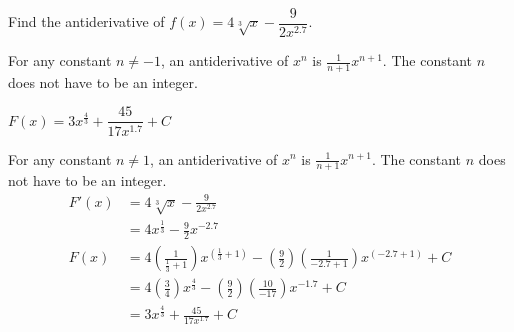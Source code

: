 \begin{Mquestion}
Find the antiderivative of
$f(x)=4\sqrt[3]{x}-\dfrac{9}{2x^{2.7}}$.
\end{Mquestion}
\begin{hint}
For any constant $n\neq -1$, an antiderivative of $x^n$ is $\frac{1}{n+1}x^{n+1}$. The constant $n$ does not have to be an integer.
\end{hint}
\begin{answer}
$F(x)=3x^{\tfrac{4}{3}}+\dfrac{45}{17x^{1.7}}+C$
\end{answer}
\begin{solution}
For any constant $n\ne 1$, an antiderivative of $x^n$ is $\frac{1}{n+1}x^{n+1}$. The constant $n$ does not have to be an integer.
\begin{align*}
F'(x)&=4\sqrt[3]{x}-\frac{9}{2x^{2.7}}\\
&=4 x^{\tfrac{1}{3}}-\frac{9}{2}x^{-2.7}\\
F(x)&=4\left(\frac{1}{\frac{1}{3}+1}\right)x^{\left(\tfrac{1}{3}+1\right)}-\left(\frac{9}{2}\right)\left(\frac{1}{-2.7+1}\right)x^{(-2.7+1)}+C\\
&=4\left(\frac{3}{4}\right)x^{\tfrac{4}{3}}-\left(\frac{9}{2}\right)\left(\frac{10}{-17}\right)x^{-1.7}+C\\
&=3x^{\tfrac{4}{3}}+\frac{45}{17x^{1.7}}+C
\end{align*}
\end{solution}



